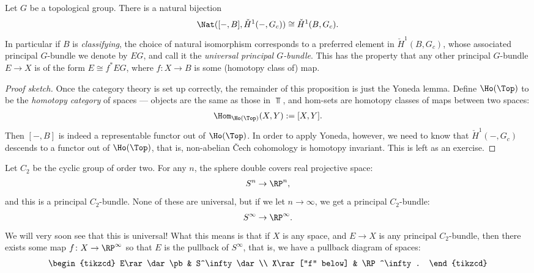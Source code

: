 \documentclass[11pt]{amsart}
\begin{document}
\begin{proposition}\label{prop:classifying-bundle}
Let $G$ be a topological group. There is a natural bijection
\[
\Nat([-,B], \check{H}^1(-,G_c)) \cong \check{H}^1(B,G_c).
\]
In particular if $B$ is \emph{classifying}, the choice of natural isomorphism corresponds to a preferred element in $\check{H}^1(B,G_c)$, whose associated principal $G$-bundle we denote by $EG$, and call it the \emph{universal principal $G$-bundle}. This has the property that any other principal $G$-bundle $E\to X$ is of the form $E\cong f^\ast EG$, where $f\colon X \to B$ is some (homotopy class of) map.
\end{proposition}
\begin{proof}[Proof sketch] Once the category theory is set up correctly, the remainder of this proposition is just the Yoneda lemma. Define $\Ho(\Top)$ to be the \emph{homotopy category} of spaces --- objects are the same as those in $\Top$, and hom-sets are homotopy classes of maps between two spaces:
\begin{align*}
    \Hom_{\Ho(\Top)}(X,Y) := [X,Y].
\end{align*}
Then $[-,B]$ is indeed a representable functor out of $\Ho(\Top)$. In order to apply Yoneda, however, we need to know that $\check{H}^1(-,G_c)$ descends to a functor out of $\Ho(\Top)$, that is, non-abelian \v{C}ech cohomology is homotopy invariant. This is left as an exercise.
\end{proof}

\begin{example}
\label{exa:universal-c2-bundle}    
Let $C_2$ be the cyclic group of order two. For any $n$, the sphere double covers real projective space:
\begin{align*}
    S^n \to \RP^n,
\end{align*}
and this is a principal $C_2$-bundle. None of these are universal, but if we let $n\to \infty$, we get a principal $C_2$-bundle:
\begin{align*}
    S^\infty \to \RP^\infty.
\end{align*}
We will very soon see that this is universal! What this means is that if $X$ is any space, and $E\to X$ is any principal $C_2$-bundle, then there exists some map $f \colon X \to \RP^\infty$ so that $E$ is the pullback of $S^\infty$, that is, we have a pullback diagram of spaces:
\[
\begin{tikzcd}
    E\rar\dar\pb & S^\infty\dar \\
    X\rar["f" below] & \RP^\infty.
\end{tikzcd}
\]
\end{example}
\end{document}
